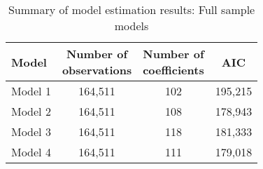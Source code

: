 \documentclass[]{elsarticle} %
\begin{document}
\begin{table}

\caption{\label{tab:model-full-sample-summary}\label{tab:model-full-sample-summary}Summary of model estimation results: Full sample models}
\centering
\fontsize{7}{9}\selectfont
\begin{tabular}[t]{lccc}
\toprule
Model & \makecell[l]{Number of\\observations} & \makecell[l]{Number of\\coefficients} & AIC\\
\midrule
\rowcolor{gray!6}  Model 1 & 164,511 & 102 & 195,215\\
Model 2 & 164,511 & 108 & 178,943\\
\rowcolor{gray!6}  Model 3 & 164,511 & 118 & 181,333\\
Model 4 & 164,511 & 111 & 179,018\\
\bottomrule
\end{tabular}
\end{table}
\end{document}
